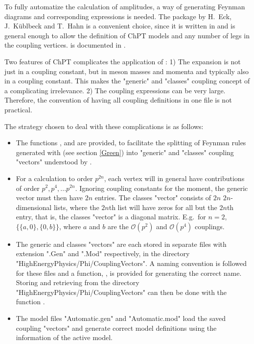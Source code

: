 To fully automatize the calculation of amplitudes, a way of generating Feynman diagrams and
corresponding expressions  is needed. The package \fa by H.~Eck, J.~K\"ublbeck and T.~Hahn
is a convenient choice, since it is written in \mma
and is general enough to allow the definition of ChPT models and any number of legs in the
coupling vertices. \fa is documented in \cite{Hahn:2000kx}.

Two features of ChPT complicates the application of \fa:
1) The expansion is not just in a coupling constant, but in meson masses and momenta and
typically also in a coupling constant.
This makes the "generic" and "classes" coupling concept of \fa a complicating irrelevance.
2) The coupling expressions can be very large. Therefore, the \fa convention of having all
coupling definitions in one file is not practical.

The strategy chosen to deal with these complications is as follows:
\begin{itemize}
\item The functions ,  and 
are provided, to facilitate the splitting of Feynman rules generated with
 (see section \ref{Green}) into "generic" and "classes" coupling "vectors"
understood by \fa.
\item For a calculation to order $p^{2 n}$, each vertex will in general have contributions of
order $p^2, p^4, ... p^{2 n}$. Ignoring coupling constants for the moment, the generic vector must
then have $2 n$ entries. The classes "vector" consists of $2 n$ $2 n$-dimensional lists,
where the $2 n$th list will have zeros for all but the $2 n$th entry, that is, the classes
"vector" is a diagonal matrix. E.g.~for $n=2$, $\{\{a,0\},\{0,b\}\}$, where $a$ and $b$ are the
$\mathscr{O}(p^2)$ and $\mathscr{O}(p^4)$ couplings.
\item The generic and classes "vectors" are each stored in separate files with extension
".Gen" and ".Mod" respectively, in the directory "HighEnergyPhysics/Phi/CouplingVectors".
A naming convention is followed for these files and a
function, , is provided for generating the correct name.
Storing and retrieving from the directory "HighEnergyPhysics/Phi/CouplingVectors" can then
be done with the function .
\item The \fa model files "Automatic.gen" and "Automatic.mod" load the saved coupling "vectors"
and generate correct \fa model definitions using the information of the active \fphi model.
\end{itemize}

